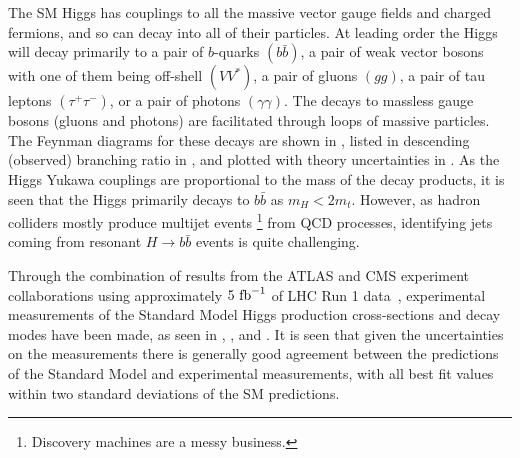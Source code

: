 The SM Higgs has couplings to all the massive vector gauge fields and charged fermions, and so can decay into all of their particles.
At leading order the Higgs will decay primarily to a pair of $b$-quarks $(b\bar{b})$, a pair of weak vector bosons with one of them being off-shell $(VV^{*})$, a pair of gluons $(gg)$, a pair of tau leptons $(\tau^{+}\tau^{-})$, or a pair of photons $(\gamma\gamma)$.
The decays to massless gauge bosons (gluons and photons) are facilitated through loops of massive particles.
The Feynman diagrams for these decays are shown in , listed in descending (observed) branching ratio in , and plotted with theory uncertainties in .
As the Higgs Yukawa couplings are proportional to the mass of the decay products, it is seen that the Higgs primarily decays to $b\bar{b}$ as $m_{H} < 2 m_{t}$.
However, as hadron colliders mostly produce multijet events%
\footnote{Discovery machines are a messy business.}
from QCD processes, identifying jets coming from resonant $H \to b\bar{b}$ events is quite challenging.

Through the combination of results from the ATLAS and CMS experiment collaborations using approximately $5~\mathrm{fb}^{-1}$ of LHC Run 1 data~\cite{Pieri:2016szr}, experimental measurements of the Standard Model Higgs production cross-sections and decay modes have been made, as seen in , , and .
It is seen that given the uncertainties on the measurements there is generally good agreement between the predictions of the Standard Model and experimental measurements, with all best fit values within two standard deviations of the SM predictions.


